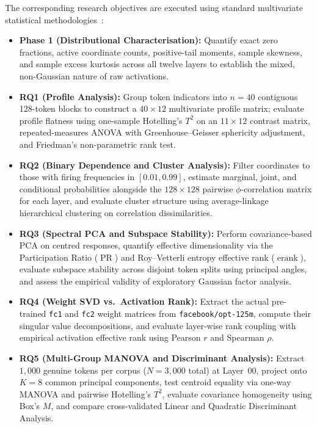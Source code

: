 \documentclass[12pt, a4paper, oneside]{report}
\theoremstyle{definition}
\newcommand{\erank}{\operatorname{erank}}
\newcommand{\PR}{\operatorname{PR}}
\begin{document}
The corresponding research objectives are executed using standard multivariate statistical methodologies~\cite{anderson2003introduction, johnson2014applied, rao1973linear}:
\begin{itemize}
    \item \textbf{Phase 1 (Distributional Characterisation):} Quantify exact zero fractions, active coordinate counts, positive-tail moments, sample skewness, and sample excess kurtosis across all twelve layers to establish the mixed, non-Gaussian nature of raw activations.
    \item \textbf{RQ1 (Profile Analysis):} Group token indicators into $n = 40$ contiguous 128-token blocks to construct a $40 \times 12$ multivariate profile matrix; evaluate profile flatness using one-sample Hotelling's $T^2$ on an $11 \times 12$ contrast matrix, repeated-measures ANOVA with Greenhouse--Geisser sphericity adjustment, and Friedman's non-parametric rank test.
    \item \textbf{RQ2 (Binary Dependence and Cluster Analysis):} Filter coordinates to those with firing frequencies in $[0.01, 0.99]$, estimate marginal, joint, and conditional probabilities alongside the $128 \times 128$ pairwise $\phi$-correlation matrix for each layer, and evaluate cluster structure using average-linkage hierarchical clustering on correlation dissimilarities.
    \item \textbf{RQ3 (Spectral PCA and Subspace Stability):} Perform covariance-based PCA on centred responses, quantify effective dimensionality via the Participation Ratio ($\PR$) and Roy--Vetterli entropy effective rank ($\erank$), evaluate subspace stability across disjoint token splits using principal angles, and assess the empirical validity of exploratory Gaussian factor analysis.
    \item \textbf{RQ4 (Weight SVD vs.\ Activation Rank):} Extract the actual pre-trained \texttt{fc1} and \texttt{fc2} weight matrices from \texttt{facebook/opt-125m}, compute their singular value decompositions, and evaluate layer-wise rank coupling with empirical activation effective rank using Pearson $r$ and Spearman $\rho$.
    \item \textbf{RQ5 (Multi-Group MANOVA and Discriminant Analysis):} Extract $1{,}000$ genuine tokens per corpus ($N = 3{,}000$ total) at Layer~00, project onto $K = 8$ common principal components, test centroid equality via one-way MANOVA and pairwise Hotelling's $T^2$, evaluate covariance homogeneity using Box's $M$, and compare cross-validated Linear and Quadratic Discriminant Analysis.
\end{itemize}
\end{document}
